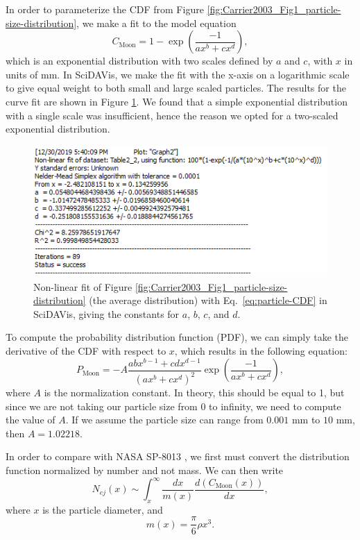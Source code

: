 \documentclass{hitec}
\numberwithin{equation}{section}
\begin{document}
In order to parameterize the CDF from Figure \ref{fig:Carrier2003_Fig1_particle-size-distribution}, we make a fit to the model equation
\begin{equation}\label{eq:particle-CDF}
C_{\text{Moon}} = 1 - \exp\left(\frac{-1}{ax^b+cx^d}\right),
\end{equation}
which is an exponential distribution with two scales defined by $a$ and $c$, with $x$ in units of mm. In \textsf{SciDAVis}, we make the fit with the x-axis on a logarithmic scale to give equal weight to both small and large scaled particles. The results for the curve fit are shown in Figure \ref{fig:Fit-to-CDF}. We found that a simple exponential distribution with a single scale was insufficient, hence the reason we opted for a two-scaled exponential distribution.

\begin{figure}[h!]
	\centering
	\includegraphics[scale=1]{Fit-to-CDF.PNG}
	\caption{Non-linear fit of Figure \ref{fig:Carrier2003_Fig1_particle-size-distribution} (the average distribution) with Eq.\ \ref{eq:particle-CDF} in \textsf{SciDAVis}, giving the constants for $a$, $b$, $c$, and $d$.}\label{fig:Fit-to-CDF}
\end{figure}

To compute the probability distribution function (PDF), we can simply take the derivative of the CDF with respect to $x$, which results in the following equation:
\begin{equation}
P_{\text{Moon}} = -A\frac{abx^{b-1}+cdx^{d-1}}{(ax^b+cx^d)^2}\exp\left(\frac{-1}{ax^b+cx^d}\right),
\end{equation}
where $A$ is the normalization constant. In theory, this should be equal to 1, but since we are not taking our particle size from 0 to infinity, we need to compute the value of $A$. If we assume the particle size can range from $0.001$ mm to $10$ mm, then $A = 1.02218$.

In order to compare with NASA SP-8013 \citep{cour1969meteoroid}, we first must convert the distribution function normalized by number and not mass. We can then write
\begin{equation}\label{eq:N_ej_carrier1}
N_{ej}(x) \sim \int_{x}^{\infty}\frac{dx}{m(x)}\frac{d(C_{\text{Moon}}(x))}{dx},
\end{equation}
where $x$ is the particle diameter, and
\begin{equation}
m(x) = \frac{\pi}{6}\rho x^3.
\end{equation}
\end{document}
